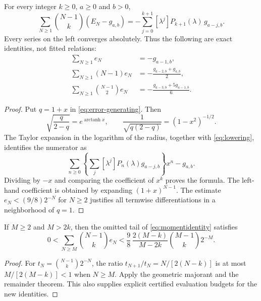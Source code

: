 \begin{theorem}\label{thm:moments}
For every integer $k\ge0$, $a\ge0$ and $b>0$,
\begin{equation}\label{eq:momentidentity}
 \boxed{\sum_{N\ge1}\binom{N-1}{k}(E_N-g_{a,b})
 =-\sum_{j=0}^{k+1}[\lambda^j]P_{k+1}(\lambda)\,g_{a-j,b}.}
\end{equation}
Every series on the left converges absolutely. Thus the following are exact identities, not fitted relations:
\begin{align}
 \sum_{N\ge1}e_N&=-g_{a-1,b},\label{eq:moment0}\\
 \sum_{N\ge1}(N-1)e_N&=-\frac{g_{a-2,b}+g_{a,b}}{2},\label{eq:moment1}\\
 \sum_{N\ge1}\binom{N-1}{2}e_N
 &=-\frac{g_{a-3,b}+5g_{a-1,b}}{6}.\label{eq:moment2}
\end{align}
\end{theorem}
\begin{proof}
Put $q=1+x$ in \eqref{eq:error-generating}. Then
\[
 \sqrt{\frac{q}{2-q}}=e^{\operatorname{arctanh}x},\qquad
 \frac1{\sqrt{q(2-q)}}=(1-x^2)^{-1/2}.
\]
The Taylor expansion in the logarithm of the radius, together with \eqref{eq:lowering}, identifies the numerator as
\[
 \sum_{n\ge0}\left\{\sum_j[\lambda^j]P_n(\lambda)g_{a-j,b}\right\}x^n-g_{a,b}.
\]
Dividing by $-x$ and comparing the coefficient of $x^k$ proves the formula. The left-hand coefficient is obtained by expanding $(1+x)^{N-1}$. The estimate $e_N<(9/8)2^{-N}$ for $N\ge2$ justifies all termwise differentiations in a neighborhood of $q=1$.
\end{proof}

\begin{corollary}\label{cor:momenttail}
If $M\ge2$ and $M>2k$, then the omitted tail of \eqref{eq:momentidentity} satisfies
\begin{equation}\label{eq:momenttail}
 0<\sum_{N\ge M}\binom{N-1}{k}e_N
 <\frac98\,\frac{2(M-k)}{M-2k}\binom{M-1}{k}2^{-M}.
\end{equation}
\end{corollary}
\begin{proof}
For $t_N=\binom{N-1}{k}2^{-N}$, the ratio $t_{N+1}/t_N=N/[2(N-k)]$ is at most $M/[2(M-k)]<1$ when $N\ge M$. Apply the geometric majorant and the remainder theorem. This also supplies explicit certified evaluation budgets for the new identities.
\end{proof}

